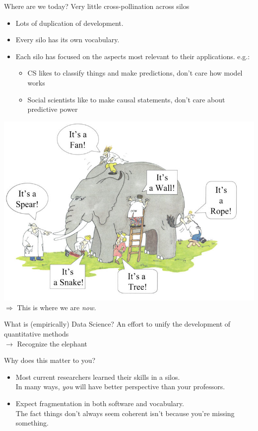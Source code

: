 \documentclass[11pt]{beamer}
\begin{document}
\begin{frame}[c]{Where are we today?}
Very little cross-pollination across silos
\begin{itemize}
	\pause \item Lots of duplication of development.
	\pause \item Every silo has its own vocabulary.
	\pause \item Each silo has focused on the aspects most relevant to their applications. e.g.:
	\begin{itemize}
		\pause \item CS likes to classify things and make predictions, don't care how model works
		\item Social scientists like to make causal statements, don't care about predictive power
	\end{itemize}
\end{itemize}
\end{frame}

\begin{frame}[c]{}
\pause \includegraphics[width=\textwidth]{blindmenelephant.jpg}
\pause $\Rightarrow$ This is where we are \emph{now.}
\end{frame}

\begin{frame}[c]{What is (empirically) Data Science?}
\pause An effort to unify the development of quantitative methods \\
\pause $\rightarrow$ Recognize the elephant
\end{frame}

\begin{frame}[c]{Why does this matter to you?}
\begin{itemize}
	\item Most current researchers learned their skills in a silos. \\
	\pause In many ways, \alert{\emph{you} will have better perspective than your professors.}
	\pause \item Expect fragmentation in both software and vocabulary. \\
	\pause The fact things don't always seem coherent isn't because you're missing something.
\end{itemize}
\end{frame}
\end{document}
